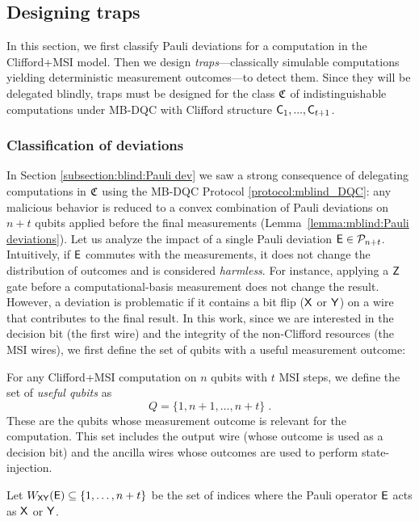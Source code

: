 \subsection{Designing traps}
\label{subsection:framework single qubit}

In this section, we first classify Pauli deviations for a computation in the Clifford+MSI model. Then we design \emph{traps}—classically simulable computations yielding deterministic measurement outcomes—to detect them. Since they will be delegated blindly, traps must be designed
for the class $\mathfrak C$ of indistinguishable computations under MB-DQC with Clifford structure $\mathsf{C}_1, ..., \mathsf{C}_{t+1}$.

\subsubsection{Classification of deviations}
In Section \ref{subsection:blind:Pauli dev} we saw a strong consequence of delegating computations in $\mathfrak C$ using the MB-DQC Protocol \ref{protocol:mblind_DQC}: any malicious behavior is reduced to a convex combination of Pauli deviations on $n+t$ qubits applied before the final measurements (Lemma~\ref{lemma:mblind:Pauli deviations}).
Let us analyze the impact of a single Pauli deviation $\mathsf{E}\in\mathcal{P}_{n+t}$.
Intuitively, if $\mathsf{E}$ commutes with the measurements, it does not change the distribution of outcomes and is considered \emph{harmless}. For instance, applying a $\mathsf{Z}$ gate before a computational-basis measurement does not change the result. However, a deviation is problematic if it contains a bit flip ($\mathsf{X}$ or $\mathsf{Y}$) on a wire that contributes to the final result.
In this work, since we are interested in the decision bit (the first wire) and the integrity of the non-Clifford resources (the MSI wires), we first define the set of qubits with a useful measurement outcome:
\begin{definition}
    \label{verification:def:useful}
    For any Clifford+MSI computation on $n$ qubits with $t$ MSI steps, we define the set of \emph{useful qubits} as
    \begin{equation}
        Q = \{1, n+1, \dots, n+t\}\; .
    \end{equation}
    These are the qubits whose measurement outcome is relevant for the computation. This set includes the output wire (whose outcome is used as a decision bit) and the ancilla wires whose outcomes are used to perform state-injection.
\end{definition}
Let $W_{\mathsf{X}\mathsf{Y}}(\mathsf{E}) \subseteq \{1, \dots, n+t\}$ be the set of indices where the Pauli operator $\mathsf{E}$ acts as $\mathsf{X}$ or $\mathsf{Y}$.
